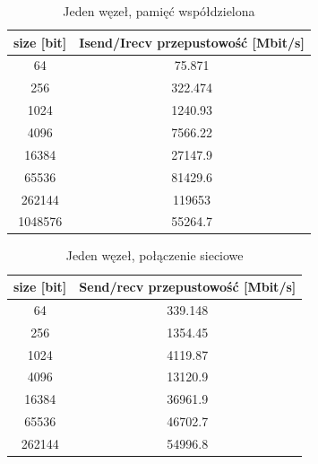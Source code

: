 \documentclass[10pt,english, openany]{book}
\begin{document}
\begin{table}[H]
\caption{Jeden węzeł, pamięć współdzielona}
\begin{center}
\begin{tabular}{|c|c|}
\hline
size {[}bit{]} & Isend/Irecv przepustowość {[}Mbit/s{]} \\ \hline
64           & 75.871                                 \\ \hline
256          & 322.474                                \\ \hline
1024         & 1240.93                                \\ \hline
4096         & 7566.22                                \\ \hline
16384        & 27147.9                                \\ \hline
65536        & 81429.6                                \\ \hline
262144       & 119653                                 \\ \hline
1048576      & 55264.7                                \\ \hline
\end{tabular}
\end{center}
\end{table}


\begin{table}[H]
\caption{Jeden węzeł, połączenie sieciowe}
\begin{center}
\begin{tabular}{|c|c|}
\hline
size {[}bit{]} & Send/recv przepustowość {[}Mbit/s{]} \\ \hline
64           & 339.148                              \\ \hline
256          & 1354.45                              \\ \hline
1024         & 4119.87                              \\ \hline
4096         & 13120.9                              \\ \hline
16384        & 36961.9                              \\ \hline
65536        & 46702.7                              \\ \hline
262144       & 54996.8                              \\ \hline
\end{tabular}
\end{center}
\end{table}
\end{document}
